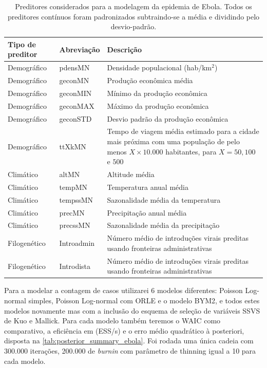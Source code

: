 \begin{table}[h]
    \centering
    \begin{tabular}{|p{5cm} |p{5cm} |p{5cm} |}
    \hline
        Tipo de preditor & Abreviação & Descrição \\ \hline
        Demográfico & pdensMN & Densidade populacional (hab/km$^2$) \\\hline
       Demográfico &geconMN& Produção econômica média\\\hline
        Demográfico&geconMIN& Mínimo da produção econômica\\\hline
        Demográfico&geconMAX& Máximo da produção econômica\\\hline
        Demográfico&geconSTD& Desvio padrão da produção econômica\\\hline
        Demográfico&ttXkMN& Tempo de viagem média estimado para a cidade mais próxima com uma população de pelo menos $X \times 10.000$ habitantes, para $X = 50, 100$ e $500$\\\hline
        Climático&altMN& Altitude média\\\hline
        Climático&tempMN& Temperatura anual média\\\hline
        Climático&tempssMN&Sazonalidade média da temperatura\\\hline
        Climático&precMN& Precipitação anual média\\\hline
        Climático&precssMN&Sazonalidade média da precipitação \\\hline
        Filogenético&Introadmin& Número médio de introduções virais preditas usando fronteiras administrativas\\\hline
        Filogenético&Introdista& Número médio de introduções virais preditas usando fronteiras administrativas\\
        \hline
    \end{tabular}
    \caption{Preditores considerados para a modelagem da epidemia de Ebola. Todos os preditores contínuos foram padronizados subtraindo-se a média e dividindo pelo desvio-padrão.}
    \label{tab:ebola_predictors}
\end{table}


Para a modelar a contagem de casos utilizarei 6 modelos diferentes: Poisson Log-normal simples, Poisson Log-normal com ORLE e o modelo BYM2, e todos estes modelos novamente mas com a inclusão do esquema de seleção de variáveis SSVS de Kuo e Mallick. Para cada modelo também teremos o WAIC como comparativo, a eficiência em (ESS/s) e o erro médio quadrático à posteriori, disposta na \autoref{tab:posterior_summary_ebola}. Foi rodada uma única cadeia com 300.000 iterações, 200.000 de \textit{burnin} com parâmetro de thinning igual a 10 para cada modelo.

